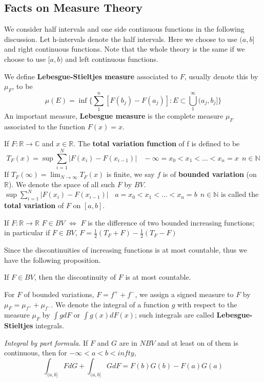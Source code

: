 \documentclass[12pt]{article}
\newenvironment{theorem}[1][Theorem.]{\begin{trivlist}
\item[\hskip \labelsep {\bfseries #1}]}{\end{trivlist}}
\newenvironment{definition}[1][Definition.]{\begin{trivlist}
\item[\hskip \labelsep {\bfseries #1}]}{\end{trivlist}}
\newenvironment{proposition}[1][Proposition.]{\begin{trivlist}
\item[\hskip \labelsep {\bfseries #1}]}{\end{trivlist}}
\begin{document}
\subsection*{Facts on Measure Theory}
We consider half intervals and one side continuous functions in the following discussion. Let h-intervals  denote the half intervals. Here we choose to use $(a,b]$ and right continuous functions. Note that the whole theory is the same if we choose to use $[a,b)$ and left continuous functions.
\begin{definition}
We define {\textbf{Lebesgue-Stieltjes measure}} associated to $F$, usually denote this by $\mu_F$, to be \[
\mu(E) = \inf\{\sum\limits_1^n[F(b_j)-F(a_j)]: E \subset \bigcup_1^{\infty}(a_j,b_j]\}
\]
An important measure,  {\textbf{Lebesgue measure}} is the complete measure $\mu_F$ associated to the function $F(x) = x$.

\end{definition}
\begin{definition}
If $F: \mathbb{R} \rightarrow \mathbb{C}$ and $x \in \mathbb{R}$. The {\textbf {total variation function}} of f is defined to be
\[
T_F(x) = \sup \sum\limits_{i=1}^N |F(x_i)-F(x_{i-1})| \ \ \ \ -\infty = x_0 < x_1<...<x_n=x\ \ n\in \mathbb{N}
\]
If $T_F(\infty) = \lim_{N\rightarrow \infty}T_F(x)$ is finite, we say $f$ is of {\textbf{bounded variation}} (on $\mathbb{R}$). We denote the space of all such $F$ by $BV$. $\sup \sum_{i=1}^N |F(x_i)-F(x_{i-1})| \ \ \ \ a = x_0 < x_1<...<x_n=b\ \ n\in \mathbb{N}$ is called the {\textbf {total variation}} of $F$ on $[a,b]$.
\end{definition}
\begin{theorem}
If $F: \mathbb{R} \rightarrow \mathbb{R}$ $F\in BV$ $\Leftrightarrow$ $F$ is the difference of two bounded increasing functions; in particular if $F\in BV$, $F = \frac{1}{2}(T_F+F) - \frac{1}{2}(T_F-F) $
\end{theorem}
Since the discontinuities of increasing functions is at most countable, thus we have the following proposition.
\begin{proposition}
If $F\in BV$, then the discontinuity of $F$ is at most countable.
\end{proposition}
For $F$ of bounded variations, $F = f^+ + f^-$, we assign a signed measure to $F$ by $\mu_F = \mu_{f^+} + \mu_{f^-}$.
We denote the integral of a function $g$ with respect to the measure $\mu_F$ by $\int gdF$ or $\int g(x)dF(x)$; such integrals are called \textbf{Lebesgue-Stieltjes} integrals.
\begin{theorem} \textit{Integral by part formula}.
If $F$ and $G$ are in $NBV$ and at least on of them is continuous, then for $-\infty < a < b < infty$, 
\[
\int_{(a,b]}FdG + \int_{(a,b]}GdF = F(b)G(b) - F(a)G(a)
\]
\end{theorem} 
\end{document}
